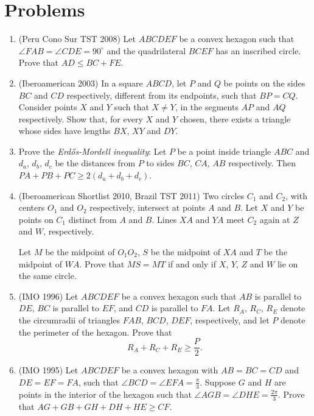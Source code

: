 \documentclass[10pt]{article}
\theoremstyle{definition}
\theoremstyle{remark}
\begin{document}
\section{Problems}
\begin{enumerate}
\item (Peru Cono Sur TST 2008) Let $ABCDEF$ be a convex hexagon such that $\angle FAB = \angle CDE = 90^\circ$ and the quadrilateral $BCEF$ has an inscribed circle. Prove that $AD \leq BC + FE$.

\item (Iberoamerican 2003) In a square $ABCD$, let $P$ and $Q$ be points on the sides $BC$ and $CD$ respectively, different from its endpoints, such that $BP = CQ$. Consider points $X$ and $Y$ such that $X\neq Y$, in the segments $AP$ and $AQ$ respectively. Show that, for every $X$ and $Y$ chosen, there exists a triangle whose sides have lengths $BX$, $XY$ and $DY$.

\item Prove the \emph{Erd\H os-Mordell inequality}: Let $P$ be a point inside triangle $ABC$ and $d_a$, $d_b$, $d_c$ be the distances from $P$ to sides $BC$, $CA$, $AB$ respectively. Then $PA + PB + PC \geq 2(d_a + d_b + d_c)$.

\item (Iberoamerican Shortlist 2010, Brazil TST 2011) Two circles $C_1$ and $C_2$, with centers $O_1$ and $O_2$ respectively, intersect at points $A$ and $B$. Let $X$ and $Y$ be points on $C_1$ distinct from $A$ and $B$. Lines $XA$ and $YA$ meet $C_2$ again at $Z$ and $W$, respectively.

Let $M$ be the midpoint of $O_1O_2$, $S$ be the midpoint of $XA$ and $T$ be the midpoint of $WA$. Prove that $MS = MT$ if and only if $X$, $Y$, $Z$ and $W$ lie on the same circle.

\item (IMO 1996) Let $ABCDEF$ be a convex hexagon such that $AB$ is parallel to $DE$, $BC$ is parallel to $EF$, and $CD$ is parallel to $FA$. Let $R_A$, $R_C$, $R_E$ denote the circumradii of triangles $FAB$, $BCD$, $DEF$, respectively, and let $P$ denote the perimeter of the hexagon. Prove that 
$$R_{A}+R_{C}+R_{E}\geq\frac{P}{2}.$$	

\item (IMO 1995) Let $ABCDEF$ be a convex hexagon with $AB = BC = CD$ and $DE = EF = FA$, such that $\angle BCD =\angle EFA =\frac{\pi}3$. Suppose $G$ and $H$ are points in the interior of the hexagon such that $\angle AGB =\angle DHE =\frac{2\pi}3$. Prove that $AG+GB+GH+DH+HE\geq CF$.


\end{enumerate}
\end{document}

